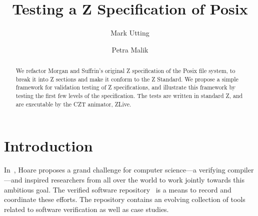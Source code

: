 \documentclass{llncs}
\begin{document}
\pagestyle{headings}  %
%
\title{Testing a Z Specification of Posix}
%
\author{Mark Utting \and Petra Malik}
%
%
%

\maketitle              %

\begin{abstract}
  We refactor Morgan and Suffrin's original Z specification of the Posix
  file system, to break it into Z sections and make it conform to the Z
  Standard.  We propose a simple framework for validation testing of Z
  specifications, and illustrate this framework by testing the first few
  levels of the specification.  The tests are written in standard Z, and
  are executable by the CZT animator, ZLive.
\end{abstract}

\section{Introduction}

In~\cite{Hoa03}, Hoare proposes a grand challenge for computer
science---a verifying compiler---and inspired researchers from all
over the world to work jointly towards this ambitious goal.  The
verified software repository~\cite{BicHoaWoo06} is a means to record
and coordinate these efforts.  The repository contains an evolving
collection of tools related to software verification as well as case
studies.
\end{document}
